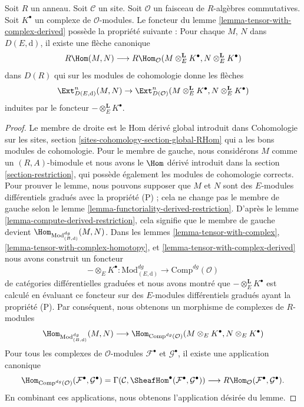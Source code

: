 \begin{lemma}
\label{lemma-upgrade-tensor-with-complex-derived}
Soit $R$ un anneau. Soit $\mathcal{C}$ un site. Soit $\mathcal{O}$ un
faisceau de $R$-algèbres commutatives. Soit $K^\bullet$ un
complexe de $\mathcal{O}$-modules. Le
foncteur du lemme
\ref{lemma-tensor-with-complex-derived} possède la propriété suivante :
Pour chaque $M$, $N$ dans $D(E, \text{d})$, il existe une flèche
canonique
$$
R\Hom(M, N)
\longrightarrow
R\Hom_\mathcal{O}(M \otimes_E^\mathbf{L} K^\bullet, N
\otimes_E^\mathbf{L} K^\bullet)
$$
dans $D(R)$ qui sur les modules de cohomologie donne les flèches
$$
\Ext^n_{D(E, \text{d})}(M, N) \to
\Ext^n_{D(\mathcal{O})}
(M \otimes_E^\mathbf{L} K^\bullet, N \otimes_E^\mathbf{L} K^\bullet)
$$
induites par le foncteur $- \otimes_E^\mathbf{L} K^\bullet$.
\end{lemma}

\begin{proof}
Le membre de droite est le Hom dérivé global introduit dans Cohomologie
sur les sites, section \ref{sites-cohomology-section-global-RHom} qui a les bons
modules de cohomologie. Pour le membre de
gauche, nous considérons $M$ comme un $(R, A)$-bimodule et nous avons le
$\Hom$ dérivé introduit dans la section \ref{section-restriction}, qui possède
également les modules de cohomologie corrects. Pour
prouver le lemme, nous pouvons supposer que $M$ et $N$ sont des
$E$-modules différentiels gradués avec la propriété (P) ; cela ne change pas le
membre de gauche selon
le lemme \ref{lemma-functoriality-derived-restriction}.
D'après le lemme
\ref{lemma-compute-derived-restriction}, cela signifie que le membre de gauche devient
$\Hom_{\text{Mod}^{dg}_{(B, \text{d})}}(M, N)$. Dans les
lemmes \ref{lemma-tensor-with-complex},
\ref{lemma-tensor-with-complex-homotopy}, et
\ref{lemma-tensor-with-complex-derived} nous avons
construit un foncteur
$$
- \otimes_E K^\bullet :
\text{Mod}^{dg}_{(E, \text{d})}
\longrightarrow
\text{Comp}^{dg}(\mathcal{O})
$$
de catégories différentielles graduées
et nous avons montré que $- \otimes_E^\mathbf{L} K^\bullet$ est calculé en évaluant
ce foncteur sur des $E$-modules
différentiels gradués ayant la propriété (P). Par conséquent,
nous obtenons un morphisme de complexes de $R$-modules
$$
\Hom_{\text{Mod}^{dg}_{(B, \text{d})}}(M, N)
\longrightarrow
\Hom_{\text{Comp}^{dg}(\mathcal{O})}
(M \otimes_E K^\bullet, N \otimes_E K^\bullet)
$$
Pour tous les complexes de $\mathcal{O}$-modules
$\mathcal{F}^\bullet$ et $\mathcal{G}^\bullet$, il existe une
application canonique
$$
\Hom_{\text{Comp}^{dg}(\mathcal{O})}
(\mathcal{F}^\bullet, \mathcal{G}^\bullet) =
\Gamma(\mathcal{C},
\SheafHom^\bullet(\mathcal{F}^\bullet, \mathcal{G}^\bullet))
\longrightarrow
R\Hom_\mathcal{O}(\mathcal{F}^\bullet, \mathcal{G}^\bullet).
$$
En combinant ces
applications, nous obtenons l'application désirée du lemme.
\end{proof}

